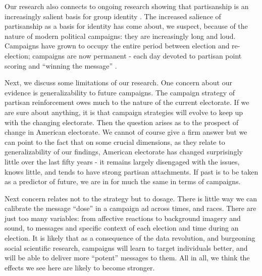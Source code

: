 \documentclass[12pt, letterpaper]{article}
\begin{document}
Our research also connects to ongoing research showing that partisanship is an increasingly salient basis for group identity \citep{iyengar2012, freeze2012}. The increased salience of partisanship as a basis for identity has come about, we suspect, because of the nature of modern political campaigns: they are increasingly long and loud. Campaigns have grown to occupy the entire period between election and re-election; campaigns are now permanent - each day devoted to partisan point scoring and ``winning the message'' \citep[see][]{blumenthal1982}.

Next, we discuss some limitations of our research. One concern about our evidence is generalizability to future campaigns. The campaign strategy of partisan reinforcement owes much to the nature of the current electorate. If we are sure about anything, it is that campaign strategies will evolve to keep up with the changing electorate. Then the question arises as to the prospect of change in American electorate. We cannot of course give a firm answer but we can point to the fact that on some crucial dimensions, as they relate to generalizability of our findings, American electorate has changed surprisingly little over the last fifty years - it remains largely disengaged with the issues, knows little, and tends to have strong partisan attachments. If past is to be taken as a predictor of future, we are in for much the same in terms of campaigns. 
    
Next concern relates not to the strategy but to dosage. There is little way we can calibrate the message ``dose'' in a campaign ad across times, and races. There are just too many variables: from affective reactions to background imagery and sound, to messages and specific context of each election and time during an election. It is likely that as a consequence of the data revolution, and burgeoning social scientific research, campaigns will learn to target individuals better, and will be able to deliver more ``potent'' messages to them. All in all, we think the effects we see here are likely to become stronger.
\end{document}
